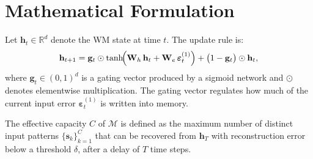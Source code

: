 \section{Mathematical Formulation}

Let $\mathbf{h}_t \in \mathbb{R}^{d}$ denote the WM state at time $t$.  The update rule is:
\begin{equation}
  \mathbf{h}_{t+1}
    = \mathbf{g}_t \odot \tanh\!\Bigl(\mathbf{W}_h\,\mathbf{h}_t
        + \mathbf{W}_e\,\boldsymbol{\varepsilon}^{(1)}_t\Bigr)
      + \bigl(1 - \mathbf{g}_t\bigr) \odot \mathbf{h}_t,
  \label{eq:wm}
\end{equation}
where $\mathbf{g}_t \in (0,1)^d$ is a gating vector produced by a sigmoid network and
$\odot$ denotes elementwise multiplication.  The gating vector regulates how much of the
current input error $\boldsymbol{\varepsilon}^{(1)}_t$ is written into memory.

\begin{definition}
The effective capacity $C$ of $\mathcal{M}$ is defined as the maximum number of distinct
input patterns $\{\mathbf{s}_k\}_{k=1}^{C}$ that can be recovered from $\mathbf{h}_T$
with reconstruction error below a threshold $\delta$, after a delay of $T$ time steps.
\end{definition}
